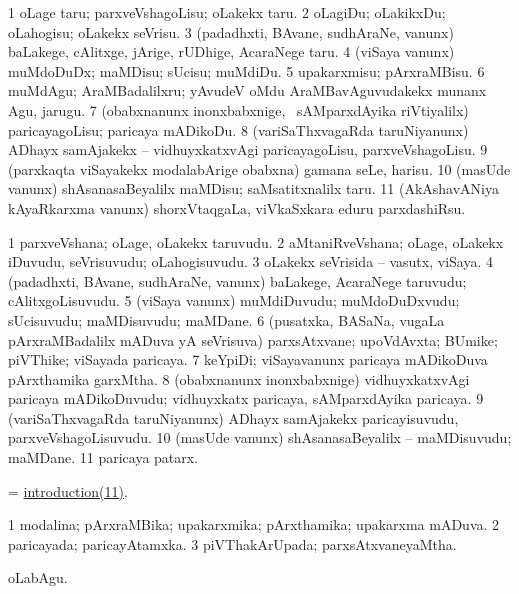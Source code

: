 \bentry
{}
\gl{\sakirx}
\bmng
\bnum
\num{1} oLage taru; parxveVshagoLisu; oLakekx taru. 
\num{2} oLagiDu; oLakikxDu; oLahogisu; oLakekx seVrisu. 
\num{3} (padadhxti, BAvane, sudhAraNe, \mo vanunx) baLakege, cAlitxge, jArige, rUDhige, AcaraNege taru. 
\num{4} (viSaya \mo vanunx) muMdoDuDx; maMDisu; sUcisu; muMdiDu. 
\num{5} upakarxmisu; pArxraMBisu. 
\num{6} muMdAgu; AraMBadalilxru; yAvudeV oMdu AraMBavAguvudakekx munanx Agu, jarugu. 
\num{7} (obabxnanunx inonxbabxnige, \kanmu\ sAMparxdAyika riVtiyalilx) paricayagoLisu; paricaya mADikoDu. 
\num{8} (variSaThxvagaRda taruNiyanunx) ADhayx samAjakekx -- vidhuyxkatxvAgi paricayagoLisu, parxveVshagoLisu. 
\num{9} (parxkaqta viSayakekx modalabArige obabxna) gamana seLe, harisu. 
\num{10} (masUde \mo vanunx) shAsanasaBeyalilx maMDisu; saMsatitxnalilx taru. 
\num{11} (AkAshavANiya kAyaRkarxma \mo vanunx) shorxVtaqgaLa, viVkaSxkara eduru parxdashiRsu. 
\enum
\emng
\eentry

\bentry
{}
\gl{\nA}
\bmng
\bnum
\num{1} parxveVshana; oLage, oLakekx taruvudu. 
\num{2} aMtaniRveVshana; oLage, oLakekx iDuvudu, seVrisuvudu; oLahogisuvudu. 
\num{3} oLakekx seVrisida -- vasutx, viSaya. 
\num{4} (padadhxti, BAvane, sudhAraNe, \mo vanunx) baLakege, AcaraNege taruvudu; cAlitxgoLisuvudu. 
\num{5} (viSaya \mo vanunx) muMdiDuvudu; muMdoDuDxvudu; sUcisuvudu; maMDisuvudu; maMDane. 
\num{6} (pusatxka, BASaNa, \mo vugaLa pArxraMBadalilx mADuva yA seVrisuva) parxsAtxvane; upoVdAvxta; BUmike; piVThike; viSayada paricaya. 
\num{7} keYpiDi; viSayavanunx paricaya mADikoDuva pArxthamika garxMtha. 
\num{8} (obabxnanunx inonxbabxnige) vidhuyxkatxvAgi paricaya mADikoDuvudu; vidhuyxkatx paricaya, sAMparxdAyika paricaya. 
\num{9} (variSaThxvagaRda taruNiyanunx) ADhayx samAjakekx paricayisuvudu, parxveVshagoLisuvudu. 
\num{10} (masUde \mo vanunx) shAsanasaBeyalilx -- maMDisuvudu; maMDane. 
\hypertarget{introduction(11)}{} 
\num{11} paricaya patarx. 
\enum
\emng

\noindent 
\gl{\pagu}
\bmng
{} = \hyperlink{introduction(11)}{introduction(11)}. 
\emng
\eentry

\bentry
{}
\gl{\gu}
\bmng
\bnum
\num{1} modalina; pArxraMBika; upakarxmika; pArxthamika; upakarxma mADuva. 
\num{2} paricayada; paricayAtamxka. 
\num{3} piVThakArUpada; parxsAtxvaneyaMtha. 
\enum
\emng
\eentry

\bentry
{}
\gl{\nA}
\bmng
oLabAgu. 
\emng
\eentry

